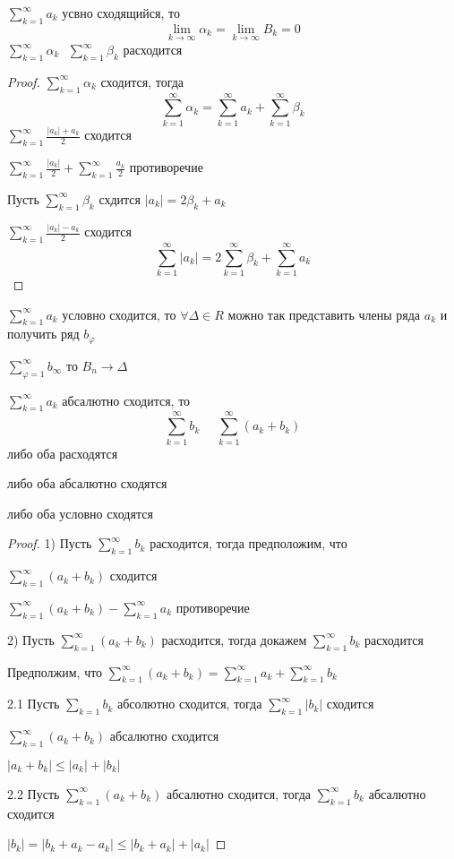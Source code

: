 \begin{theorem}
  $\sum_{k=1}^{\infty} a_k$ усвно сходящийся, то
  $$
  \lim_{k \to \infty} \alpha_k = \lim_{k \to \infty} B_k = 0
  $$
  $\sum_{k=1}^{\infty} \alpha_k ~~~ \sum_{k=1}^{\infty} \beta_k$ расходится
\end{theorem}

\begin{proof}
  $\sum_{k=1}^{\infty} \alpha_k$ сходится, тогда
  $$
  \sum_{k=1}^{\infty} \alpha_k =
  \sum_{k=1}^{\infty} a_k + \sum_{k=1}^{\infty} \beta_k
  $$
  $\sum_{k=1}^{\infty} \frac{|a_k| + a_k}{2}$ сходится

  $\sum_{k=1}^{\infty} \frac{|a_k|}{2} + \sum_{k=1}^{\infty} \frac{a_k}{2}$
  противоречие

  Пусть $\sum_{k=1}^{\infty} \beta_k$ схдится
  $|a_k| = 2\beta_k + a_k$

  $\sum_{k=1}^{\infty} \frac{|a_k| - a_k}{2}$ сходится
  $$
  \sum_{k=1}^{\infty} |a_k| =
  2 \sum_{k=1}^{\infty} \beta_k +
  \sum_{k=1}^{\infty} a_k
  $$
\end{proof}

\begin{theorem}
  $\sum_{k=1}^{\infty} a_k$ условно сходится, то
  $\forall \Delta \in R $ можно так представить члены ряда $a_k$ и получить
  ряд $b_{\varphi}$

  $\sum_{\varphi=1}^{\infty} b_{\infty}$ то $B_n \to \Delta$
\end{theorem}

\begin{theorem}
  $\sum_{k=1}^{\infty} a_k$ абсалютно сходится, то
  $$
  \sum_{k=1}^{\infty} b_k ~~~~~~ \sum_{k=1}^{\infty} (a_k + b_k)
  $$
  либо оба расходятся

  либо оба абсалютно сходятся

  либо оба условно сходятся
\end{theorem}

\begin{proof}
  1) Пусть $\sum_{k=1}^{\infty} b_k$ расходится, тогда предположим, что

  $\sum_{k=1}^{\infty} (a_k + b_k)$ сходится

  $\sum_{k=1}^{\infty} (a_k + b_k) - \sum_{k=1}^{\infty} a_k$ противоречие

  2) Пусть $\sum_{k=1}^{\infty} (a_k + b_k)$ расходится, тогда докажем
  $\sum_{k=1}^{\infty} b_k$ расходится

  Предполжим, что $\sum_{k=1}^{\infty} (a_k + b_k) =
  \sum_{k=1}^{\infty} a_k + \sum_{k=1}^{\infty} b_k$

  2.1 Пусть $\sum_{k=1} b_k$ абсолютно сходится, тогда
  $\sum_{k=1}^{\infty} |b_k|$ сходится

  $\sum_{k=1}^{\infty} (a_k + b_k)$ абсалютно сходится

  $|a_k + b_k| \le |a_k| + |b_k|$

  2.2 Пусть $\sum_{k=1}^{\infty} (a_k + b_k)$ абсалютно сходится, тогда
  $\sum_{k=1}^{\infty} b_k$ абсалютно сходится

  $|b_k| = |b_k + a_k - a_k| \le | b_k + a_k| + |a_k|$
\end{proof}